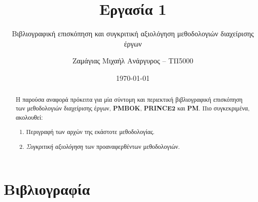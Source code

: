 \documentclass[12pt]{turabian-researchpaper}
\title{Εργασία 1}
\subtitle{Βιβλιογραφική επισκόπηση και συγκριτική αξιολόγηση μεθοδολογιών διαχείρισης έργων}
\author{Ζαμάγιας Μιχαήλ Ανάργυρος -- ΤΠ5000}
\date{\today}
\begin{document}
\begin{titlepage}
    \maketitle
\end{titlepage}

\begin{abstract}
    Η παρούσα αναφορά πρόκειτα για μία σύντομη και περιεκτική βιβλιογραφική επισκόπηση των μεθοδολογιών διαχείρισης έργων, \textbf{PMBOK}, \textbf{PRINCE2} και \textbf{PM}.
    Πιο συγκεκριμένα, ακολουθεί:
    \begin{enumerate}
        \item Περιγραφή των αρχών της εκάστοτε μεθοδολογίας.
        \item \textit{Συγκριτική αξιολόγηση} των προαναφερθέντων μεθοδολογιών.
    \end{enumerate}
\end{abstract}

\tableofcontents

\newpage

\section{Βιβλιογραφία}
\end{document}
